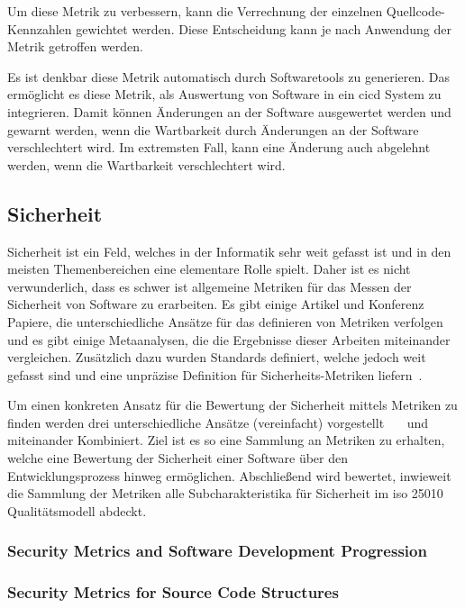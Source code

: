 \documentclass[12pt, a4paper, ngerman]{article}
\begin{document}
Um diese Metrik zu verbessern,
kann die Verrechnung der einzelnen Quellcode-Kennzahlen
gewichtet werden.
Diese Entscheidung kann je nach Anwendung der Metrik getroffen werden.

Es ist denkbar diese Metrik automatisch durch
Softwaretools zu generieren.
Das ermöglicht es diese Metrik, als Auswertung von Software
in ein \ac{cicd} System zu integrieren.
Damit können Änderungen an der Software ausgewertet werden
und gewarnt werden, wenn die Wartbarkeit durch Änderungen an der Software verschlechtert wird.
Im extremsten Fall, kann eine Änderung auch abgelehnt werden, wenn die Wartbarkeit verschlechtert wird.

\subsection{Sicherheit}

Sicherheit ist ein Feld, welches in der Informatik sehr weit gefasst ist und in den meisten Themenbereichen eine elementare Rolle spielt.
Daher ist es nicht verwunderlich, dass es schwer ist allgemeine Metriken für das Messen der Sicherheit von Software zu erarbeiten.
Es gibt einige Artikel und Konferenz Papiere, die unterschiedliche Ansätze für das definieren von Metriken verfolgen und es gibt einige 
Metaanalysen, die die Ergebnisse dieser Arbeiten miteinander vergleichen. 
Zusätzlich dazu wurden Standards definiert, welche jedoch weit gefasst sind und eine unpräzise Definition für Sicherheits-Metriken liefern~\cite{MeFlado_Fernández-Medina_Piattini_2010}.

Um einen konkreten Ansatz für die Bewertung der Sicherheit mittels Metriken zu finden werden 
drei unterschiedliche Ansätze (vereinfacht) vorgestellt~\cite{Jain2014SecurityMA}~\cite{Chowdhury_Chan_Zulkernine_2008}~\cite{Wang_Wang_Guo_Xia_2009} und miteinander Kombiniert.
Ziel ist es so eine Sammlung an Metriken zu erhalten, 
welche eine Bewertung der Sicherheit einer Software über den Entwicklungsprozess hinweg ermöglichen. 
Abschließend wird bewertet, inwieweit die Sammlung der Metriken alle Subcharakteristika für Sicherheit im \ac{iso} 25010 Qualitätsmodell abdeckt.

\subsubsection{Security Metrics and Software Development Progression~\cite{Jain2014SecurityMA}}

\subsubsection{Security Metrics for Source Code Structures~\cite{Chowdhury_Chan_Zulkernine_2008}}
\end{document}
